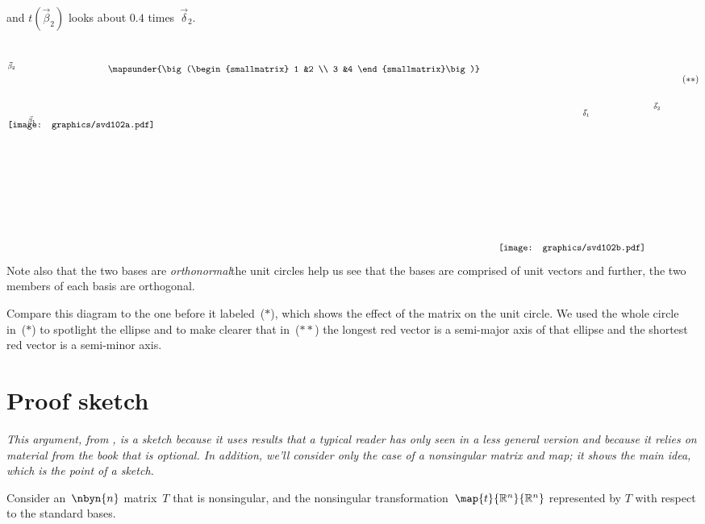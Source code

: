 and $t(\vec{\beta}_2)$ looks about $0.4$ times~$\vec{\delta}_2$. 
\begin{equation*}
  \setlength{\unitlength}{1in}
  \begin{picture}(1.35,1.35)
    \put(0,1.825){\texttt{[image: graphics/svd102a.pdf]}}
    \put(.3,1.9){\scriptsize $\vec{\beta}_1$}
    \put(0,2.7){\scriptsize $\vec{\beta}_2$}
  \end{picture}
  \quad
  \raisebox{2.65in}{$\mapsunder{\big (\begin{smallmatrix} 1 &2 \\ 3 &4 \end{smallmatrix}\big )}$}
  \qquad
  \begin{picture}(2.45,3.15)
    \put(0,0){\texttt{[image: graphics/svd102b.pdf]}}
    \put(1.25,2){\scriptsize $\vec{\delta}_1$}
    \put(2.3,2.1){\scriptsize $\vec{\delta}_2$}
  \end{picture}
  \tag*{\raisebox{2.5in}{($**$)}}
\end{equation*}
Note also that the two bases are \textit{orthonormal}\Dash the unit circles help
us see that the bases are comprised of unit vectors and further,
the two members of each basis are orthogonal.

Compare this diagram to the one before it 
labeled~($*$), which shows the effect of the matrix
on the unit circle.
We used the whole circle in~($*$) to spotlight the ellipse and 
to make clearer that in~($**$)
the longest red vector is a
semi-major axis of that ellipse and the shortest red vector is a 
semi-minor axis.



\section{Proof sketch}

\textit{This argument, 
from \cite{BlankKrikorianSpring89},
is a sketch because it uses results that a typical reader has only 
seen in a less general version and because it relies on material from the
book that is optional.
In addition, we'll consider only the case of a nonsingular matrix and map;
it shows the main idea, which is the point of a sketch.}

Consider an~$\nbyn{n}$ matrix~$T$ that is nonsingular, and the
nonsingular transformation~$\map{t}{\Re^n}{\Re^n}$ represented by
$T$ with respect to the standard bases.

